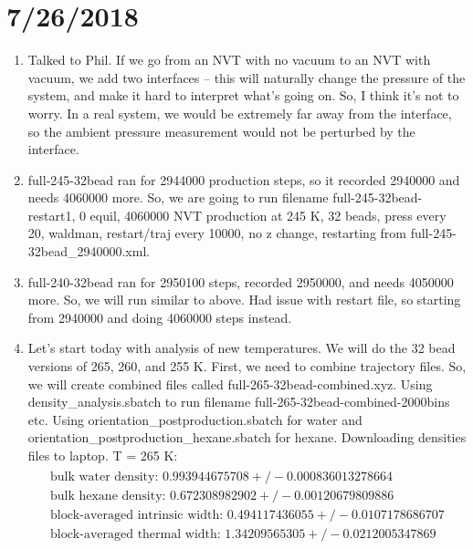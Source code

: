 \documentclass[12pt,reqno]{amsart}
\numberwithin{equation}{section}
\begin{document}
\section{7/26/2018}
\begin{enumerate}

\item Talked to Phil.  If we go from an NVT with no vacuum to an NVT with vacuum, we add two interfaces -- this will naturally change the pressure of the system, and make it hard to interpret what's going on.  So, I think it's not to worry.  In a real system, we would be extremely far away from the interface, so the ambient pressure measurement would not be perturbed by the interface.  
\item full-245-32bead ran for 2944000 production steps, so it recorded 2940000 and needs 4060000 more.  So, we are going to run filename full-245-32bead-restart1, 0 equil, 4060000 NVT production at 245 K, 32 beads, press every 20, waldman, restart/traj every 10000, no z change, restarting from full-245-32bead\_2940000.xml.  
\item full-240-32bead ran for 2950100 steps, recorded 2950000, and needs 4050000 more.  So, we will run similar to above. Had issue with restart file, so starting from 2940000 and doing 4060000 steps instead.  
\item Let's start today with analysis of new temperatures.  We will do the 32 bead versions of 265, 260, and 255 K.  First, we need to combine trajectory files.  So, we will create combined files called full-265-32bead-combined.xyz.    Using density\_analysis.sbatch to run filename full-265-32bead-combined-2000bins etc.  Using orientation\_postproduction.sbatch for water and orientation\_postproduction\_hexane.sbatch for hexane.  Downloading densities files to laptop.  
T = 265 K:
\begin{align}
\begin{split}
\text{bulk water density: } 0.993944675708  +/- 0.000836013278664 \\
\text{bulk hexane density: } 0.672308982902  +/- 0.00120679809886\\
\text{block-averaged intrinsic width: }  0.494117436055 +/- 0.0107178686707\\
\text{block-averaged thermal width: } 1.34209565305  +/- 0.0212005347869 \\
\end{split}
\end{align} 


\end{enumerate}
\end{document}
